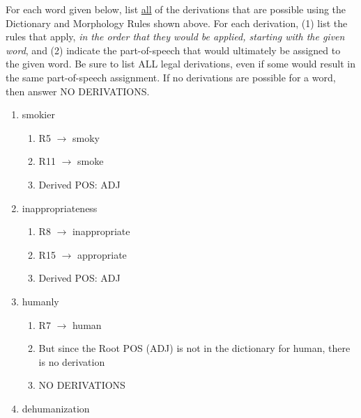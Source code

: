 \documentclass[11pt]{article}
\begin{document}
\begin{enumerate}
For each word given below, list \underline{all} of the derivations that are
possible using the Dictionary and Morphology Rules shown above.  For
each derivation, (1) list the rules that apply, {\it in the order that
  they would be applied, starting with the given word}, and (2) indicate the part-of-speech that
would ultimately be assigned to the given word. Be sure to list ALL legal
derivations, even if some would result in the same part-of-speech
assignment. If no derivations are possible for a word, then answer
NO DERIVATIONS. 

\begin{enumerate}

\item smokier

    \begin{enumerate}
    
    \item R5 $\rightarrow$ smoky
    \item R11 $\rightarrow$ smoke
    \item Derived POS: ADJ
    
    \end{enumerate}        


\item inappropriateness  

    \begin{enumerate}
    
    \item R8 $\rightarrow$ inappropriate
    \item R15 $\rightarrow$ appropriate
    \item Derived POS: ADJ
    
    \end{enumerate}    

\item humanly  

    \begin{enumerate}
    
    \item R7 $\rightarrow$ human
    \item But since the Root POS (ADJ) is not in the dictionary for human, there is no derivation
    \item NO DERIVATIONS
    
    \end{enumerate} 
    

\item dehumanization

    \begin{enumerate}
    

\end{enumerate}
\end{enumerate}
\end{enumerate}
\end{document}

